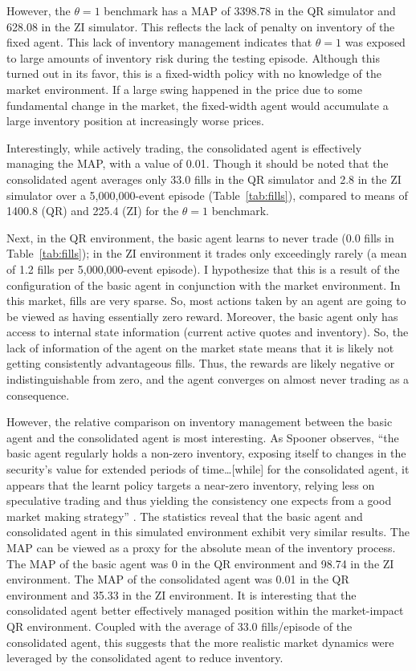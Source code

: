 \documentclass{article}
\begin{document}
However, the $\theta=1$ benchmark has a MAP of 3398.78 in the QR simulator and 628.08 in the ZI simulator. This reflects the lack of penalty on inventory of the fixed agent. This lack of inventory management indicates that $\theta=1$ was exposed to large amounts of inventory risk during the testing episode. Although this turned out in its favor, this is a fixed-width policy with no knowledge of the market environment. If a large swing happened in the price due to some fundamental change in the market, the fixed-width agent would accumulate a large inventory position at increasingly worse prices.

Interestingly, while actively trading, the consolidated agent is effectively managing the MAP, with a value of 0.01. Though it should be noted that the consolidated agent averages only 33.0 fills in the QR simulator and 2.8 in the ZI simulator over a 5{,}000{,}000-event episode (Table~\ref{tab:fills}), compared to means of 1400.8 (QR) and 225.4 (ZI) for the $\theta=1$ benchmark.

Next, in the QR environment, the basic agent learns to never trade (0.0 fills in Table~\ref{tab:fills}); in the ZI environment it trades only exceedingly rarely (a mean of 1.2 fills per 5{,}000{,}000-event episode). I hypothesize that this is a result of the configuration of the basic agent in conjunction with the market environment. In this market, fills are very sparse. So, most actions taken by an agent are going to be viewed as having essentially zero reward. Moreover, the basic agent only has access to internal state information (current active quotes and inventory). So, the lack of information of the agent on the market state means that it is likely not getting consistently advantageous fills. Thus, the rewards are likely negative or indistinguishable from zero, and the agent converges on almost never trading as a consequence.

However, the relative comparison on inventory management between the basic agent and the consolidated agent is most interesting. As Spooner observes, ``the basic agent regularly holds a non-zero inventory, exposing itself to changes in the security's value for extended periods of time\ldots [while] for the consolidated agent, it appears that the learnt policy targets a near-zero inventory, relying less on speculative trading and thus yielding the consistency one expects from a good market making strategy'' \citep{spooner2018}. The statistics reveal that the basic agent and consolidated agent in this simulated environment exhibit very similar results. The MAP can be viewed as a proxy for the absolute mean of the inventory process. The MAP of the basic agent was 0 in the QR environment and 98.74 in the ZI environment. The MAP of the consolidated agent was 0.01 in the QR environment and 35.33 in the ZI environment. It is interesting that the consolidated agent better effectively managed position within the market-impact QR environment. Coupled with the average of 33.0 fills/episode of the consolidated agent, this suggests that the more realistic market dynamics were leveraged by the consolidated agent to reduce inventory.
\end{document}
